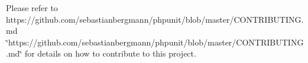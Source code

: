 Please refer to https\+://github.com/sebastianbergmann/phpunit/blob/master/\+C\+O\+N\+T\+R\+I\+B\+U\+T\+I\+N\+G.\+md \char`\"{}https\+://github.\+com/sebastianbergmann/phpunit/blob/master/\+C\+O\+N\+T\+R\+I\+B\+U\+T\+I\+N\+G.\+md\char`\"{} for details on how to contribute to this project. 